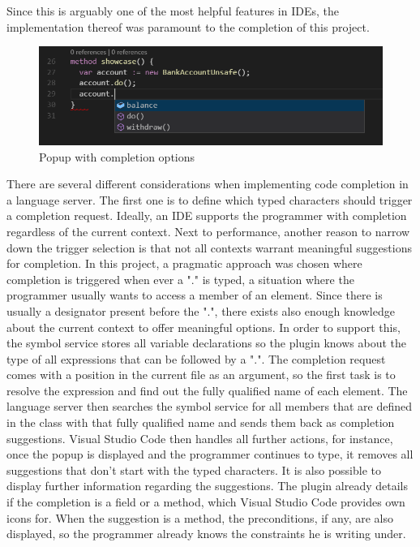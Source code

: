  Since this is arguably one of the most helpful features in IDEs, the implementation thereof was paramount to the completion of this project. \newline
 
 \begin{figure}[H]
 	\centering
 	\includegraphics[width=1\textwidth]{img/codeCompletionOverview}
 	\caption{Popup with completion options}
 	\label{fig:codecompletionoverview}
 \end{figure}
 
 There are several different considerations when implementing code completion in a language server. The first one is to define which typed characters should trigger a completion request. Ideally, an IDE supports the programmer with completion regardless of the current context. Next to performance, another reason to narrow down the trigger selection is that not all contexts warrant meaningful suggestions for completion. In this project, a pragmatic approach was chosen where completion is triggered when ever a "." is typed, a situation where the programmer usually wants to access a member of an element. Since there is usually a designator present before the ".", there exists also enough knowledge about the current context to offer meaningful options. \newline
 In order to support this, the symbol service stores all variable declarations so the plugin knows about the type of all expressions that can be followed by a ".". The completion request comes with a position in the current file as an argument, so the first task is to resolve the expression and find out the fully qualified name of each element. The language server then searches the symbol service for all members that are defined in the class with that fully qualified name and sends them back as completion suggestions. \newline
 Visual Studio Code then handles all further actions, for instance, once the popup is displayed and the programmer continues to type, it removes all suggestions that don't start with the typed characters. It is also possible to display further information regarding the suggestions. The plugin already details if the completion is a field or a method, which Visual Studio Code provides own icons for. When the suggestion is a method, the preconditions, if any, are also displayed, so the programmer already knows the constraints he is writing under. \newline
 
